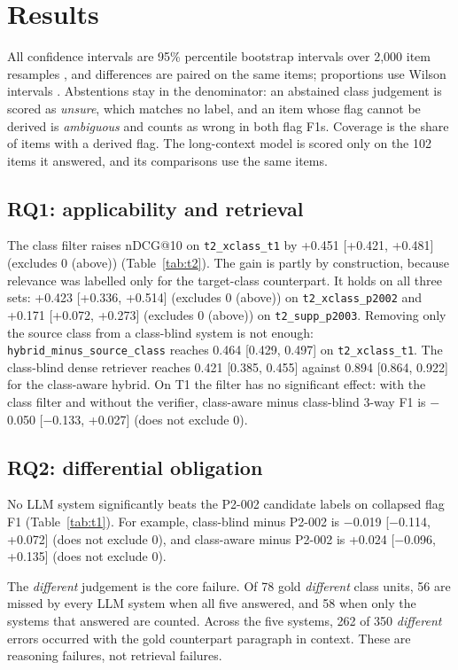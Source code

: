 \documentclass[conference]{IEEEtran}
\begin{document}
\section{Results}\label{sec:results}
All confidence intervals are 95\% percentile bootstrap intervals over 2,000 item resamples \cite{efron1979}, and differences
are paired on the same items; proportions use Wilson intervals \cite{wilson1927}. Abstentions stay in the denominator: an
abstained class judgement is scored as \textit{unsure}, which matches no label, and an item whose flag cannot be derived is
\textit{ambiguous} and counts as wrong in both flag F1s. Coverage is the share of items with a derived flag. The long-context model
is scored only on the 102 items it answered, and its comparisons use the same items.

\subsection{RQ1: applicability and retrieval}
The class filter raises nDCG@10 on \texttt{t2\_xclass\_t1} by +0.451 [+0.421, +0.481] (excludes 0 (above))
(Table~\ref{tab:t2}). The gain is partly by construction, because relevance was labelled only for the target-class counterpart. It holds on all three
sets: +0.423 [+0.336, +0.514] (excludes 0 (above)) on \texttt{t2\_xclass\_p2002} and
+0.171 [+0.072, +0.273] (excludes 0 (above)) on \texttt{t2\_supp\_p2003}. Removing only the source class from a
class-blind system is not enough: \texttt{hybrid\_minus\_source\_class} reaches
0.464 [0.429, 0.497] on \texttt{t2\_xclass\_t1}. The
class-blind dense retriever reaches 0.421 [0.385, 0.455] against
0.894 [0.864, 0.922] for the class-aware hybrid. On T1 the filter has no
significant effect: with the class filter and without the verifier, class-aware minus class-blind 3-way F1 is
$-$0.050 [$-$0.133, +0.027] (does not exclude 0).



\subsection{RQ2: differential obligation}
No LLM system significantly beats the P2-002 candidate labels on collapsed flag F1 (Table~\ref{tab:t1}). For example, class-blind
minus P2-002 is $-$0.019 [$-$0.114, +0.072] (does not exclude 0), and class-aware minus P2-002 is
+0.024 [$-$0.096, +0.135] (does not exclude 0).

The \textit{different} judgement is the core failure. Of 78 gold \textit{different} class units,
56 are missed by every LLM system when all five answered, and 58
when only the systems that answered are counted. Across the five systems, 262 of 350 \textit{different} errors occurred with
the gold counterpart paragraph in context. These are reasoning failures, not retrieval failures.
\end{document}
